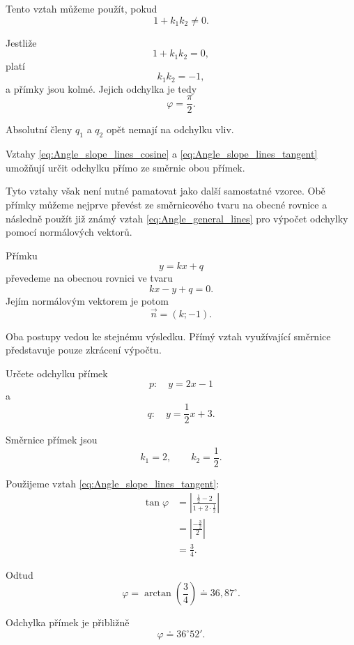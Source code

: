 Tento vztah můžeme použít, pokud
\[
    1+k_1k_2\neq0.
\]

Jestliže
\[
    1+k_1k_2=0,
\]
platí
\[
    k_1k_2=-1,
\]
a přímky jsou kolmé. Jejich odchylka je tedy
\[
    \varphi=\frac{\pi}{2}.
\]

Absolutní členy $q_1$ a $q_2$ opět nemají na odchylku vliv.

\begin{remark}\label{rem:Alternative_method_angle_slope_lines}
    Vztahy \eqref{eq:Angle_slope_lines_cosine}
    a \eqref{eq:Angle_slope_lines_tangent} umožňují určit odchylku
    přímo ze směrnic obou přímek.

    Tyto vztahy však není nutné pamatovat jako další samostatné
    vzorce. Obě přímky můžeme nejprve převést ze směrnicového tvaru
    na obecné rovnice a následně použít již známý vztah
    \eqref{eq:Angle_general_lines} pro výpočet odchylky pomocí
    normálových vektorů.

    Přímku
    \[
        y=kx+q
    \]
    převedeme na obecnou rovnici ve tvaru
    \[
        kx-y+q=0.
    \]
    Jejím normálovým vektorem je potom
    \[
        \vec{n}=(k;-1).
    \]

    Oba postupy vedou ke stejnému výsledku. Přímý vztah využívající
    směrnice představuje pouze zkrácení výpočtu.
\end{remark}

\begin{example}\label{exa:Angle_slope_intercept_lines}
    Určete odchylku přímek
    \[
        p:\quad y=2x-1
    \]
    a
    \[
        q:\quad y=\frac12x+3.
    \]

    Směrnice přímek jsou
    \[
        k_1=2,
        \qquad
        k_2=\frac12.
    \]

    Použijeme vztah
    \eqref{eq:Angle_slope_lines_tangent}:
    \begin{align*}
        \tan\varphi
        &=
        \left|
            \frac{\frac12-2}
            {1+2\cdot\frac12}
        \right|\\
        &=
        \left|
            \frac{-\frac32}{2}
        \right|\\
        &=
        \frac34.
    \end{align*}

    Odtud
    \[
        \varphi
        =
        \arctan\left(\frac34\right)
        \doteq
        36{,}87^\circ.
    \]

    Odchylka přímek je přibližně
    \[
        \varphi\doteq36^\circ52'.
    \]
\end{example}

